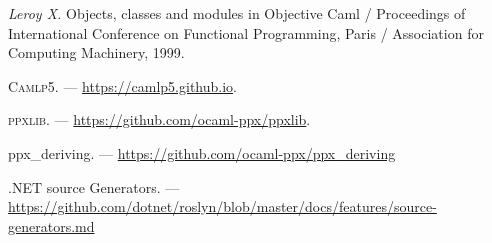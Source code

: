 \documentclass[a4paper,twoside,11pt]{article}
\newcommand{\camlpfive}{\textsc{Camlp5}}
\numberwithin{equation}{section}
\begin{document}
\begin{thebibliography}{99}
{\em       Leroy X.} 
Objects, classes and modules in Objective Caml / Proceedings of International Conference on Functional Programming, Paris /     Association for Computing Machinery, 1999.


\camlpfive{}. --- \url{https://camlp5.github.io}.
 
\textsc{ppxlib}. --- \url{https://github.com/ocaml-ppx/ppxlib}.

ppx\_deriving. --- \url{https://github.com/ocaml-ppx/ppx\_deriving}

.NET source Generators. --- \url{https://github.com/dotnet/roslyn/blob/master/docs/features/source-generators.md}

\begin{comment}
\bibitem{AZ97}
{\em Абрамов С.А., Зима Е.В.} Семинар по компьютерной алгебре на
факультете вычислительной математики и кибернетики МГУ в 1995--1996 г.
// Программирование, 1997,
No 1. С. 75--77.

\bibitem{AZ98}
{\em Абрамов С.А., Зима Е.В.} Научно-ис\-сле\-до\-вательский семинар
``Компьютерная алгебра'' в 1996--1997 г.
// Программирование, 1998,
No 1. С. 69--72.

\bibitem{AR99}
{\em Абрамов С.А., Ростовцев В.А.} Семинар по компьютерной алгебре в
1997--1998 г.  // Программирование, 1998, No 6. С. 3--7.

\bibitem{AKR00}
{\em Абрамов С.А., Крюков А.П., Ростовцев В.А.} Семинар по компьютерной
алгебре в
1998--1999 г.  // Программирование, 2000, No 1. С. 8--12.

\bibitem{AKR01}
{\em Абрамов С.А., Крюков А.П., Ростовцев В.А.} Семинар по компьютерной
алгебре
в 1999--2000 г.  // Программирование, 2001, No 1. С. 3--7.

\bibitem{AKR02}
{\em Абрамов С.А., Крюков А.П., Ростовцев В.А.} Семинар по компьютерной
алгебре в 2000--2001 г.  // Программирование, 2002, No 2. С. 6--9.


\end{comment}
\end{thebibliography}
\end{document}
